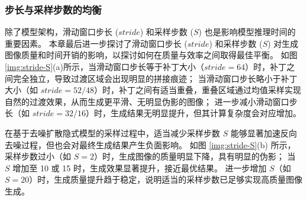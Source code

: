 \subsubsection{步长与采样步数的均衡}
除了模型架构，滑动窗口步长 ($stride$) 和采样步数 ($S$) 也是影响模型推理时间的重要因素。
本章最后进一步探讨了滑动窗口步长 ($stride$) 和采样步数 ($S$) 对生成图像质量和时间开销的影响，以探讨如何在质量与效率之间取得最佳平衡。
如图\ref{img:stride-S}(a)所示，当滑动窗口步长等于补丁大小（$stride=64$）时，补丁之间完全独立，导致过渡区域会出现明显的拼接痕迹；
当滑动窗口步长略小于补丁大小（如 $stride=52/48$）时，补丁之间有适当重叠，重叠区域通过均值采样实现自然的过渡效果，从而生成更平滑、无明显伪影的图像；
进一步减小滑动窗口步长（如 $stride=32/16$）时，生成结果无明显提升，但其计算复杂度会对应增加。

在基于去噪扩散隐式模型的采样过程中，适当减少采样步数 $S$ 能够显著加速反向去噪过程，但也会对最终生成结果产生负面影响。
如图 \ref{img:stride-S}(b) 所示，采样步数过小（如 $S=2$）时，生成图像的质量明显下降，具有明显的伪影；
当 $S$ 增加至 10 或 15 时，生成效果显著提升，接近最优结果。
进一步增加 $S$（如 $S=20$）时，生成质量提升趋于稳定，说明适当的采样步数已足够实现高质量图像生成。
